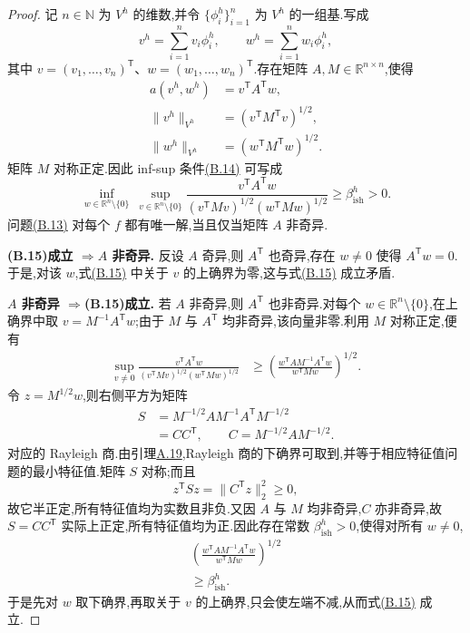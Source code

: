 \begin{proof}
记 $n\in\mathbb N$ 为 $V^h$ 的维数,并令 $\{\phi_i^h\}_{i=1}^n$ 为 $V^h$ 的一组基.写成
\[
 v^h=\sum_{i=1}^n v_i\phi_i^h,\qquad
 w^h=\sum_{i=1}^n w_i\phi_i^h,
\]
其中 $v=(v_1,\ldots,v_n)^{\mathsf T}$、$w=(w_1,\ldots,w_n)^{\mathsf T}$.存在矩阵 $A,M\in\mathbb R^{n\times n}$,使得
\[
\begin{aligned}
 a(v^h,w^h)&=v^{\mathsf T}A^{\mathsf T}w,\\
 \|v^h\|_{V^h}&=(v^{\mathsf T}M^{\mathsf T}v)^{1/2},\\
 \|w^h\|_{V^h}&=(w^{\mathsf T}M^{\mathsf T}w)^{1/2}.
\end{aligned}
\]
矩阵 $M$ 对称正定.因此 inf-sup 条件\hyperref[eq:appendix-b-14]{(B.14)} 可写成
\begin{equation}\label{eq:appendix-b-15}
 \inf_{w\in\mathbb R^n\setminus\{0\}}\ 
 \sup_{v\in\mathbb R^n\setminus\{0\}}
 \frac{v^{\mathsf T}A^{\mathsf T}w}
 {(v^{\mathsf T}Mv)^{1/2}(w^{\mathsf T}Mw)^{1/2}}
 \ge\beta_{\mathrm{ish}}^h>0.
\end{equation}
问题\hyperref[eq:appendix-b-13]{(B.13)} 对每个 $f$ 都有唯一解,当且仅当矩阵 $A$ 非奇异.

\textbf{(B.15)成立 $\Longrightarrow A$ 非奇异.}
反设 $A$ 奇异,则 $A^{\mathsf T}$ 也奇异,存在 $w\ne0$ 使得 $A^{\mathsf T}w=0$.于是,对该 $w$,式\hyperref[eq:appendix-b-15]{(B.15)} 中关于 $v$ 的上确界为零,这与式\hyperref[eq:appendix-b-15]{(B.15)} 成立矛盾.

\textbf{$A$ 非奇异 $\Longrightarrow$(B.15)成立.}
若 $A$ 非奇异,则 $A^{\mathsf T}$ 也非奇异.对每个 $w\in\mathbb R^n\setminus\{0\}$,在上确界中取
$v=M^{-1}A^{\mathsf T}w$;由于 $M$ 与 $A^{\mathsf T}$ 均非奇异,该向量非零.利用 $M$ 对称正定,便有
\begin{align*}
 \sup_{v\ne0}
 \frac{v^{\mathsf T}A^{\mathsf T}w}
 {(v^{\mathsf T}Mv)^{1/2}(w^{\mathsf T}Mw)^{1/2}}
 &\ge
 \left(\frac{w^{\mathsf T}AM^{-1}A^{\mathsf T}w}
 {w^{\mathsf T}Mw}\right)^{1/2}.
\end{align*}
令 $z=M^{1/2}w$,则右侧平方为矩阵
\[
\begin{aligned}
 S&=M^{-1/2}AM^{-1}A^{\mathsf T}M^{-1/2}\\
 &=CC^{\mathsf T},\qquad
 C=M^{-1/2}AM^{-1/2}.
\end{aligned}
\]
对应的 Rayleigh 商.由引理\hyperref[lem:appendix-a-19]{A.19},Rayleigh 商的下确界可取到,并等于相应特征值问题的最小特征值.矩阵 $S$ 对称;而且
\[
 z^{\mathsf T}Sz
 =\|C^{\mathsf T}z\|_2^2\ge0,
\]
故它半正定,所有特征值均为实数且非负.又因 $A$ 与 $M$ 均非奇异,$C$ 亦非奇异,故 $S=CC^{\mathsf T}$ 实际上正定,所有特征值均为正.因此存在常数 $\beta_{\mathrm{ish}}^h>0$,使得对所有 $w\ne0$,
\[
\begin{aligned}
 \left(\frac{w^{\mathsf T}AM^{-1}A^{\mathsf T}w}
 {w^{\mathsf T}Mw}\right)^{1/2}\\
 \ge\beta_{\mathrm{ish}}^h.
\end{aligned}
\]
于是先对 $w$ 取下确界,再取关于 $v$ 的上确界,只会使左端不减,从而式\hyperref[eq:appendix-b-15]{(B.15)} 成立.
\end{proof}

